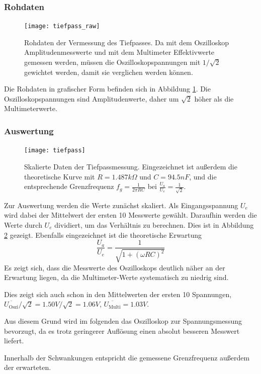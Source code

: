 \documentclass{../Misc/MontavonLaTeX/Montavon}
\begin{document}
\subsubsection{Rohdaten}
\begin{figure}[htbp]
\centering
\texttt{[image: tiefpass\_raw]}
\caption{Rohdaten der Vermessung des Tiefpasses. Da mit dem Oszilloskop Amplitudenmesswerte und mit dem Multimeter Effektivwerte gemessen werden, müssen die Oszilloskopspannungen mit $1 / \sqrt{2}$ gewichtet werden, damit sie verglichen werden können.}
\label{fig:tiefpass_raw}
\end{figure}

Die Rohdaten in grafischer Form befinden sich in Abbildung \ref{fig:tiefpass_raw}. Die Oszilloskopspannungen sind Amplitudenwerte, daher um $\sqrt{2}$ höher als die Multimeterwerte.

\subsubsection{Auswertung}
\begin{figure}[htbp]
\centering
\texttt{[image: tiefpass]}
\caption{Skalierte Daten der Tiefpassmessung. Eingezeichnet ist außerdem die theoretische Kurve mit $R = 1.487 \unit{k\Omega}$ und $C = 94.5 \unit{nF}$, und die entsprechende Grenzfrequenz $f_g = \frac{1}{2 \pi R C}$ bei $\frac{U_a}{U_e} = \frac{1}{\sqrt{2}}$.}
\label{fig:tiefpass}
\end{figure}
Zur Auswertung werden die Werte zunächst skaliert. Als Eingangsspannung $U_e$ wird dabei der Mittelwert der ersten 10 Messwerte gewählt. Daraufhin werden die Werte durch $U_e$ dividiert, um das Verhältnis zu berechnen. Dies ist in Abbildung \ref{fig:tiefpass} gezeigt. Ebenfalls eingezeichnet ist die theoretische Erwartung
\[
	\frac{U_a}{U_e} = \frac{1}{\sqrt{1 + \left(\omega R C\right)^2}}
\]
Es zeigt sich, dass die Messwerte des Oszilloskops deutlich näher an der Erwartung liegen, da die Multimeter-Werte systematisch zu niedrig sind. 

Dies zeigt sich auch schon in den Mittelwerten der ersten 10 Spannungen,
$\overline{U_\textrm{Oszi}} / \sqrt{2} = 1.50 \unit{V} / \sqrt{2} = 1.06 \unit{V}$, $\overline{U_\textrm{Multi}} = 1.03 \unit{V}$.

Aus diesem Grund wird im folgenden das Oszilloskop zur Spannungsmessung bevorzugt, da es trotz geringerer Auflösung einen absolut besseren Messwert liefert.

Innerhalb der Schwankungen entspricht die gemessene Grenzfrequenz außerdem der erwarteten.
\end{document}
